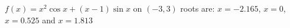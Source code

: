 {$f(x) = x^2\cos x + (x-1)\sin x$ on $(-3,3)$
}
{roots are: $x=-2.165$, $x=0$, $x=0.525$ and $x=1.813$
}

